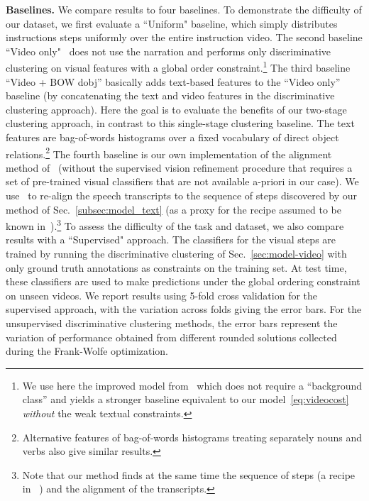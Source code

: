 \documentclass[10pt,twocolumn,letterpaper]{article}
\begin{document}
\textbf{Baselines.} 
We compare results to four baselines. 
To demonstrate the difficulty of our dataset, we first evaluate a ``Uniform" baseline, which simply distributes instructions steps uniformly over the entire instruction video.
The second baseline ``Video only"~\cite{Bojanowski14weakly} does not use the narration and performs only discriminative clustering on visual features with a global order constraint.\footnote{We use here the improved model from~\cite{Bojanowski15weakly} which does not require a ``background class'' and yields a stronger baseline equivalent to our model~\eqref{eq:videocost} \emph{without} the weak textual constraints.}
The third baseline ``Video + BOW dobj'' basically adds text-based features to the ``Video only'' baseline (by concatenating the text and video features in the discriminative clustering approach).
Here the goal is to evaluate the benefits of our two-stage clustering approach, in contrast to this single-stage clustering baseline. 
The text features are bag-of-words histograms over a fixed vocabulary of direct object relations.\footnote{Alternative features of bag-of-words histograms treating separately nouns and verbs also give similar results.}
The fourth baseline is our own implementation of the alignment method of~\cite{Malmaud15what} (without the supervised vision refinement procedure that requires a set of pre-trained visual classifiers that are not available a-priori in our case).
We use~\cite{Malmaud15what} to re-align the speech transcripts to the sequence of steps discovered by our method of Sec.~\ref{subsec:model_text} (as a proxy for the recipe assumed to be known in~\cite{Malmaud15what}).\footnote{Note that our method finds at the same time the sequence of steps (a recipe in ~\cite{Malmaud15what}) and the alignment of the transcripts.}
To assess the difficulty of the task and dataset, we also compare results with a ``Supervised" approach.
The classifiers  for the visual steps are trained by running the discriminative clustering of Sec.~\ref{sec:model-video} with only ground truth annotations as constraints on the training set.
At test time, these classifiers are used to make predictions under the global ordering constraint on unseen videos.
We report results using 5-fold cross validation for the supervised approach, with the variation 
across folds giving the error bars. 
For the unsupervised discriminative clustering methods, the error bars represent the variation of performance obtained from different rounded solutions collected during the Frank-Wolfe optimization.
\end{document}
